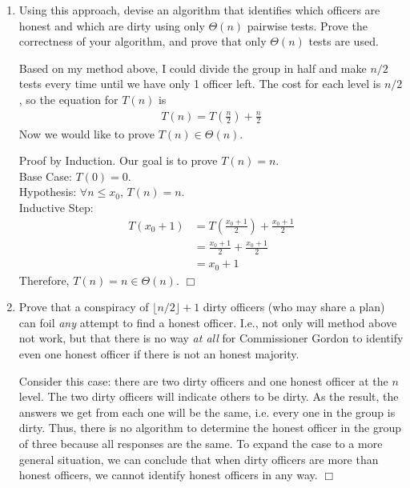 \documentclass[10pt]{article}
\newenvironment{proof}{\par\noindent{\it Proof.}\hspace*{1em}}{$\Box$\bigskip}
\begin{document}
\begin{enumerate}
    \item Using this approach, devise an algorithm that identifies which officers are honest and which are dirty using only $\Theta(n)$ pairwise tests. Prove the correctness of your algorithm, and prove that only $\Theta(n)$ tests are used.
    
    Based on my method above, I could divide the group in half and make $n/2$ tests every time until we have only 1 officer left. The cost for each level is $n/2$, so the equation for $T(n)$ is 
    \begin{align}
        T(n) = T(\frac{n}{2})+ \frac{n}{2}
    \end{align}
    Now we would like to prove $T(n) \in \Theta(n)$. 
    \begin{proof}
    Proof by Induction. Our goal is to prove $T(n)=n$.\\
    Base Case: $T(0)=0$.\\
    Hypothesis: $\forall n \leq x_0$, $T(n)=n$.\\
    Inductive Step: 
    \begin{align}
        T(x_0+1)&=T(\frac{x_0+1}{2})+\frac{x_0+1}{2}\\
                &= \frac{x_0+1}{2}+\frac{x_0+1}{2}\\
                &=x_0+1
    \end{align}
    Therefore, $T(n)=n\in \Theta(n)$.
    \end{proof}
    \item Prove that a conspiracy of $\lfloor n/2 \rfloor + 1$ dirty officers (who may share a plan) can foil \emph{any} attempt to find a honest officer. I.e., not only will method above not work, but that there is no way \emph{at all} for Commissioner Gordon to identify even one honest officer if there is not an honest majority.
    
    \begin{proof}
    Consider this case: there are two dirty officers and one honest officer at the $n$ level. The two dirty officers will indicate others to be dirty. As the result, the answers we get from each one will be the same, i.e. every one in the group is dirty. Thus, there is no algorithm to determine the honest officer in the group of three because all responses are the same. To expand the case to a more general situation, we can conclude that when dirty officers are more than honest officers, we cannot identify honest officers in any way.
    \end{proof}
\end{enumerate}
\end{document}
